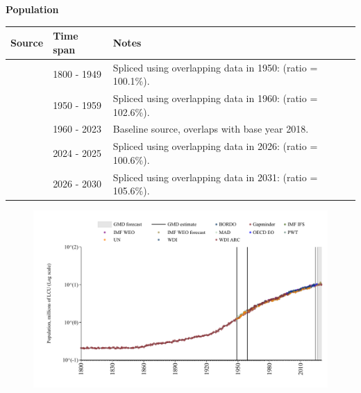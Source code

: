 \documentclass[12pt,a4paper,landscape]{article}
\begin{document}
\begin{adjustbox}{max totalsize={\paperwidth}{\paperheight},center}
\begin{minipage}[t][\textheight][t]{\textwidth}
\vspace*{0.5cm}
{}
\begin{center}
{\Large\bfseries Population}
\end{center}
\vspace{0.5cm}
\begin{table}[H]
\centering
\small
\begin{tabular}{|l|l|l|}
\hline
\textbf{Source} & \textbf{Time span} & \textbf{Notes} \\
\hline
\rowcolor{white}\cite{Gapminder}& 1800 - 1949 &Spliced using overlapping data in 1950: (ratio = 100.1\%). \\
\rowcolor{lightgray}\cite{IMF_IFS}& 1950 - 1959 &Spliced using overlapping data in 1960: (ratio = 102.6\%). \\
\rowcolor{white}\cite{WDI}& 1960 - 2023 &Baseline source, overlaps with base year 2018. \\
\rowcolor{lightgray}\cite{OECD_EO}& 2024 - 2025 &Spliced using overlapping data in 2026: (ratio = 100.6\%). \\
\rowcolor{white}\cite{Gapminder}& 2026 - 2030 &Spliced using overlapping data in 2031: (ratio = 105.6\%). \\
\hline
\end{tabular}
\end{table}
\begin{figure}[H]
\centering
\includegraphics[width=\textwidth,height=0.6\textheight,keepaspectratio]{graphs/ISR_pop.pdf}
\end{figure}
\end{minipage}
\end{adjustbox}
\end{document}

